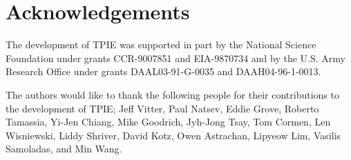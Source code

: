 \chapter*{Acknowledgements}

The development of TPIE was supported in part by the National Science
Foundation under grants CCR-9007851 and EIA-9870734 and by the U.S.
Army Research Office under grants DAAL03-91-G-0035 and
DAAH04-96-1-0013.

The authors would like to thank the following people for their
contributions to the development of TPIE; Jeff Vitter, Paul Natsev,
Eddie Grove, Roberto Tamassia, Yi-Jen Chiang, Mike Goodrich, Jyh-Jong
Tsay, Tom Cormen, Len Wisniewski, Liddy Shriver, David Kotz, Owen
Astrachan, Lipyeow Lim, Vasilis Samoladas, and Min Wang.



